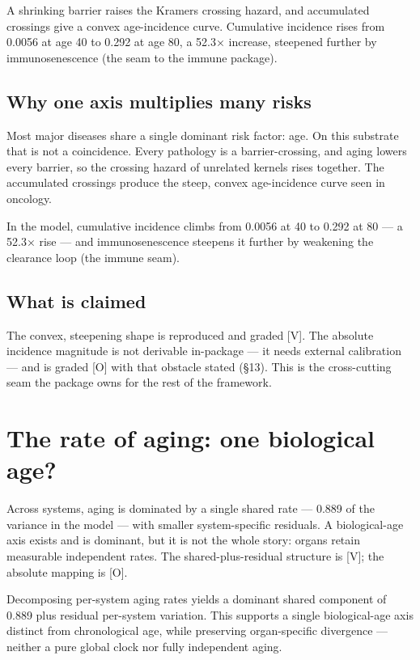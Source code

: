 \documentclass[11pt]{article}
\begin{document}
\begin{abstractbox}A shrinking barrier raises the Kramers crossing hazard, and accumulated crossings give a convex age-incidence curve. Cumulative incidence rises from 0.0056 at age 40 to 0.292 at age 80, a 52.3× increase, steepened further by immunosenescence (the seam to the immune package).\end{abstractbox}

\subsection*{Why one axis multiplies many risks}

Most major diseases share a single dominant risk factor: age. On this substrate that is not a coincidence. Every pathology is a barrier-crossing, and aging lowers every barrier, so the crossing hazard of unrelated kernels rises together. The accumulated crossings produce the steep, convex age-incidence curve seen in oncology.

In the model, cumulative incidence climbs from 0.0056 at 40 to 0.292 at 80 — a 52.3× rise — and immunosenescence steepens it further by weakening the clearance loop (the immune seam).

\subsection*{What is claimed}

The convex, steepening shape is reproduced and graded [V]. The absolute incidence magnitude is not derivable in-package — it needs external calibration — and is graded [O] with that obstacle stated (§13). This is the cross-cutting seam the package owns for the rest of the framework.

\section{The rate of aging: one biological age?}

\begin{answerbox}Across systems, aging is dominated by a single shared rate — 0.889 of the variance in the model — with smaller system-specific residuals. A biological-age axis exists and is dominant, but it is not the whole story: organs retain measurable independent rates. The shared-plus-residual structure is [V]; the absolute mapping is [O].\end{answerbox}

\begin{abstractbox}Decomposing per-system aging rates yields a dominant shared component of 0.889 plus residual per-system variation. This supports a single biological-age axis distinct from chronological age, while preserving organ-specific divergence — neither a pure global clock nor fully independent aging.\end{abstractbox}
\end{document}

